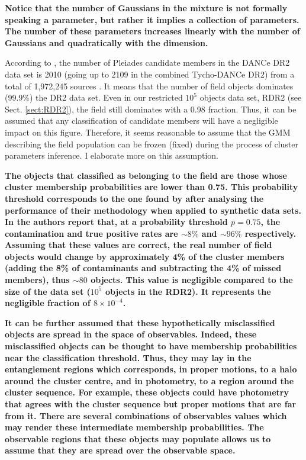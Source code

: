 \textbf{Notice that the number of Gaussians in the mixture is not formally speaking a parameter, but rather it implies a collection of parameters. The number of these parameters increases linearly with the number of Gaussians and quadratically with the dimension.} 

According to \citet{Bouy2015}, the number of Pleiades candidate members in the DANCe DR2 data set is 2010 (going up to 2109 in the combined Tycho-DANCe DR2) from a total of 1,972,245 sources . It means that the number of field objects dominates (99.9\%) the DR2 data set. Even in our restricted $10^5$ objects data set, RDR2 (see Sect. \ref{sect:RDR2}), the field still dominates with a 0.98 fraction. Thus, it can be assumed that any classification of candidate members will have a negligible impact on this figure. Therefore, it seems reasonable to assume that the GMM describing the field population can be frozen (fixed) during the process of cluster parameters inference. I elaborate more on this assumption.


\textbf{The objects that \citet{Bouy2015} classified as belonging to the field are those whose cluster membership probabilities are lower than 0.75. This probability threshold corresponds to the one found by \citet{Sarro2014} after analysing the performance of their methodology when applied to synthetic data sets. In \citet{Sarro2014} the authors report that, at a probability threshold $p=0.75$, the contamination and true positive rates are $\sim 8\%$ and $ \sim96\%$ respectively. Assuming that these values are correct, the real number of field objects would change by approximately 4\% of the cluster members (adding the 8\% of contaminants and subtracting the 4\% of missed members), thus $\sim 80$ objects. This value is negligible compared to the size of the data set ($10^5$ objects in the RDR2). It represents the negligible fraction of $ 8\times10^{-4}$. }

\textbf{It can be further assumed that these hypothetically misclassified objects are spread in the space of observables. Indeed, these misclassified objects can be thought to have membership probabilities near the classification threshold. Thus, they may lay in the entanglement regions which corresponds, in proper motions, to a halo around the cluster centre, and in photometry, to a region around the cluster sequence. For example, these objects could have photometry that agrees with the cluster sequence but proper motions that are far from it. There are several combinations of observables values which may render these intermediate membership probabilities. The observable regions that these objects may populate allows us to assume that they are spread over the observable space. } 


